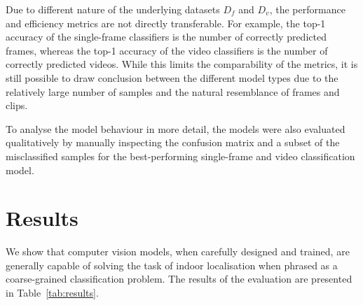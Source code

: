 \documentclass[a4paper]{article}
\begin{document}
Due to different nature of the underlying datasets $D_f$ and $D_v$, the
performance and efficiency metrics are not directly transferable. For example,
the top-1 accuracy of the single-frame classifiers is the number of correctly
predicted frames, whereas the top-1 accuracy of the video classifiers is the
number of correctly predicted videos. While this limits the comparability of
the metrics, it is still possible to draw conclusion between the different
model types due to the relatively large number of samples and the natural
resemblance of frames and clips.

To analyse the model behaviour in more detail, the models were also evaluated
qualitatively by manually inspecting the confusion matrix and a subset of the
misclassified samples for the best-performing single-frame and video
classification model. 




\section{Results} %
\label{sec:results}


We show that computer vision models, when carefully designed and trained, are
generally capable of solving the task of indoor localisation when phrased as a
coarse-grained classification problem. The results of the evaluation are
presented in Table~\ref{tab:results}.
\end{document}

